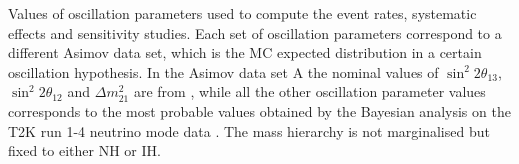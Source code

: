 \begin{table}[H]
\centering

\caption{
Values of oscillation parameters used to compute the event rates, systematic effects and sensitivity studies. Each set of oscillation parameters correspond to a different Asimov data set, which is the MC expected distribution in a certain oscillation hypothesis.
In the Asimov data set A the nominal values of $\sin^2 2 \theta_{13}$, $\sin^2 2 \theta_{12}$ and $\Delta m^2_{21}$  are from \cite{pdg_2014}, while all the other oscillation parameter values corresponds to the most probable values obtained by the Bayesian analysis on the T2K run 1-4 neutrino mode data \cite{T2KLongPaper}. The mass hierarchy is not marginalised but fixed to either NH or IH.
}
\label{tab:asimov_definition2}
\end{table}